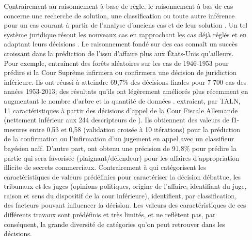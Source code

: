 Contrairement au raisonnement à base de règle, le raisonnement à bas de cas concerne une recherche de solution, une classification ou toute autre inférence pour un cas courant à partir de l'analyse d'anciens cas et de leur solution \citep{moens2002case-basedreasoning}. Un tel système juridique résout les nouveaux cas en rapprochant les cas déjà réglés et en adaptant leurs décisions \citep{Berka2011rbr-cbr}. Le raisonnement fondé sur des cas connaît un succès croissant dans la prédiction de l'issu d'affaire plus aux États-Unis qu'ailleurs. Pour exemple, \citet{katz2014predicting} entraînent des forêts aléatoires sur les cas de 1946-1953 pour prédire si la Cour Suprême infirmera ou confirmera une décision de juridiction inférieure. Ils ont réussi à atteindre 69,7\% des décisions finales pour 7 700 cas des années 1953-2013; des résultats qu'ils ont légèrement améliorés plus récemment en augmentant le nombre d'arbre et la quantité de données \citep{katz2017predictsupremecourt}. \citet{waltl2017predictgermantaxlaw} extraient, par TALN, 11 caractéristiques à partir des décisions d'appel de la Cour Fiscale Allemande (nettement inférieur aux 244 descripteurs de \citep{katz2014predicting}). Ils obtiennent des valeurs de f1-mesures entre 0,53 et 0,58 (validation croisée à 10 itérations) pour la prédiction  de la confirmation ou l'infirmation d'un jugement en appel avec un classifieur bayésien naïf.  D'autre part, \cite{Ashley2009classifCases} ont obtenu une précision de 91,8\% pour prédire la partie qui sera favorisée (plaignant/défendeur) pour les affaires d'appropriation illicite de secrets commerciaux. Contrairement à \citep{katz2014predicting} qui catégorisent les caractéristiques de valeurs prédéfinies pour caractériser la décision débattue, les tribunaux et les juges (opinions politiques, origine de l'affaire, identifiant du juge, raison et sens du dispositif de la cour inférieure), \cite{Ashley2009classifCases} identifient, par classification, des facteurs pouvant influencer la décision. Les valeurs des caractéristiques de ces différents travaux sont prédéfinis et très limités, et ne reflètent pas, par conséquent, la grande diversité de catégories qu'on peut retrouver dans les décisions. 

